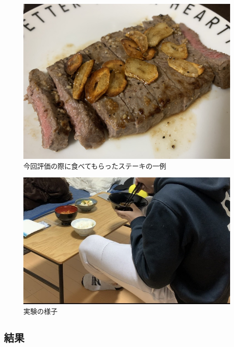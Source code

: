 \begin{figure}[htbp]
  \caption{今回評価の際に食べてもらったステーキの一例}
  \label{fig:experiment_food4}
  \begin{center}
    \includegraphics[bb=0 0 1450 1200,width=15cm]{assets/experiment_food4.jpg}
  \end{center}
\end{figure}

\begin{figure}[htbp]
  \caption{実験の様子}
  \label{fig:experiment}
  \begin{center}
    \includegraphics[bb=0 0 700 500,width=15cm]{assets/experiment.jpg}
  \end{center}
\end{figure}

\subsection{結果}

